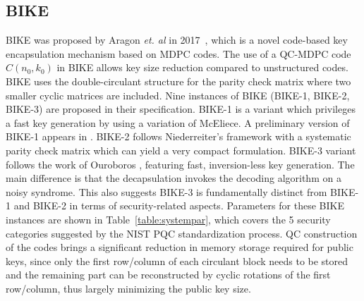 \documentclass[runningheads]{llncs}
\begin{document}
\subsection{BIKE}
%
BIKE was proposed by Aragon \textit{et. al} in 2017~\cite{aragon2017bike},
which is a novel code-based key encapsulation mechanism based on MDPC codes.
The use of a QC-MDPC code $C(n_0,k_0)$ in BIKE allows key size reduction
compared to unstructured codes.
BIKE uses the double-circulant structure for the parity check matrix
where two smaller cyclic matrices are included.
Nine instances of BIKE (BIKE-1, BIKE-2, BIKE-3) are proposed
in their specification. BIKE-1 is a variant which privileges a fast key generation by using a variation of McEliece. A preliminary version of BIKE-1 appears in \cite{barreto2017cake}.
BIKE-2 follows Niederreiter's framework with a systematic parity check matrix which can yield a very compact formulation. BIKE-3 variant follows the work of Ouroboros \cite{deneuville2017ouroboros}, featuring fast, inversion-less key generation. The main difference is that the decapsulation invokes the decoding algorithm on a noisy syndrome. This also suggests BIKE-3 is fundamentally distinct from BIKE-1 and BIKE-2 in terms of security-related aspects. 
Parameters for these BIKE instances are shown in Table~\ref{table:systempar},
which covers the 5 security categories suggested by the NIST PQC standardization process.
QC construction of the codes brings a significant reduction
in memory storage required for public keys,
since only the first row/column of each circulant block
needs to be stored and the remaining part can be
reconstructed by cyclic rotations of the first row/column,
thus largely minimizing the public key size. %
\end{document}
